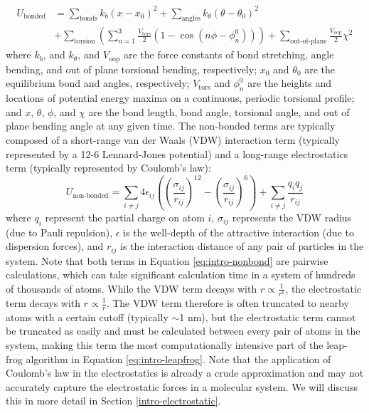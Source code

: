 \begin{equation}
    \begin{split}
        U_{\text{bonded}} &= \sum_{\text{bonds}} k_b(x-x_0)^2 + \sum_{\text{angles}} k_\theta (\theta - \theta_0)^2 \\
        &+ \sum_{\text{torsion}} \left ( \sum_{n = 1}^3 \frac{V_\text{tors}}{2} (1 - \cos (n \phi - \phi_n^0) ) \right ) + \sum_{\text{out-of-plane}} \frac{V_\text{oop}}{2} \chi^2
    \end{split}
    \label{eq:intro-bond}
\end{equation}
where $k_b$, and $k_\theta$, and $V_\text{oop}$ are the force constants of bond stretching, angle bending, and out of plane torsional bending, respectively; 
$x_0$ and $\theta_0$ are the equilibrium bond and angles, respectively; 
$V_\text{tors}$ and $\phi_n^0$ are the heights and locations of potential energy maxima on a continuous, periodic torsional profile; 
and $x$, $\theta$, $\phi$, and $\chi$ are the bond length, bond angle, torsional angle, and out of plane bending angle at any given time. 
The non-bonded terms are typically composed of a short-range van der Waals (VDW) interaction term (typically represented by a 12-6 Lennard-Jones potential) and a long-range electrostatics term (typically represented by Coulomb's law): 
\begin{equation}
    U_\text{non-bonded} = \sum_{i \ne j} 4 \epsilon_{ij} \left ( \left (\frac{\sigma_{ij}}{r_{ij}} \right )^{12} - \left (\frac{\sigma_{ij}}{r_{ij}} \right )^6 \right ) + \sum_{i \ne j} \frac{q_i q_j}{r_{ij}}
    \label{eq:intro-nonbond}
\end{equation}
where $q_i$ represent the partial charge on atom $i$, $\sigma_{ij}$ represents the VDW radius (due to Pauli repulsion), $\epsilon$ is the well-depth of the attractive interaction (due to dispersion forces), and $r_{ij}$ is the interaction distance of any pair of particles in the system. 
Note that both terms in Equation \ref{eq:intro-nonbond} are pairwise calculations, which can take significant calculation time in a system of hundreds of thousands of atoms. 
While the VDW term decays with $r \propto \frac{1}{r^6}$, the electrostatic term decays with $r \propto \frac{1}{r}$. 
The VDW term therefore is often truncated to nearby atoms with a certain cutoff (typically $\sim$1 nm), but the electrostatic term cannot be truncated as easily and must be calculated between every pair of atoms in the system, making this term the most computationally intensive part of the leap-frog algorithm in Equation \ref{eq:intro-leapfrog}. 
Note that the application of Coulomb's law in the electrostatics is already a crude approximation and may not accurately capture the electrostatic forces in a molecular system. 
We will discuss this in more detail in Section \ref{intro-electrostatic}. 


